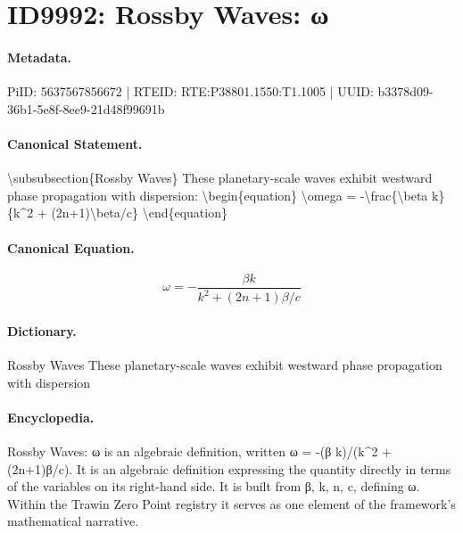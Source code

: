 \section*{ID9992: Rossby Waves: ω}
\paragraph{Metadata.}
PiID: 5637567856672 | RTEID: RTE:P38801.1550:T1.1005 | UUID: b3378d09-36b1-5e8f-8ee9-21d48f99691b

\paragraph{Canonical Statement.}
\textbackslash{}subsubsection\{Rossby Waves\} These planetary-scale waves exhibit westward phase propagation with dispersion: \textbackslash{}begin\{equation\} \textbackslash{}omega = -\textbackslash{}frac\{\textbackslash{}beta k\}\{k\textasciicircum{}2 + (2n+1)\textbackslash{}beta/c\} \textbackslash{}end\{equation\}

\paragraph{Canonical Equation.}
\[
\omega = -\frac{\beta k}{k^2 + (2n+1)\beta/c}
\]

\paragraph{Dictionary.}
Rossby Waves These planetary-scale waves exhibit westward phase propagation with dispersion

\paragraph{Encyclopedia.}
Rossby Waves: ω is an algebraic definition, written ω = -(β k)/(k\textasciicircum{}2 + (2n+1)β/c). It is an algebraic definition expressing the quantity directly in terms of the variables on its right-hand side. It is built from β, k, n, c, defining ω. Within the Trawin Zero Point registry it serves as one element of the framework's mathematical narrative.
